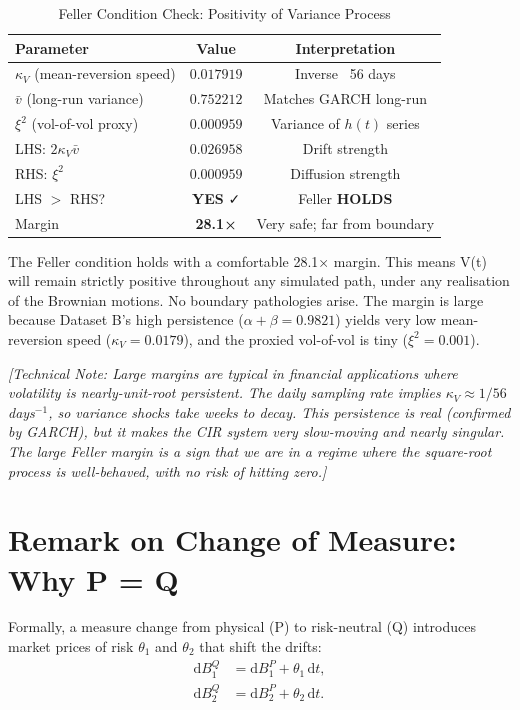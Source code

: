 \documentclass[11pt, a4paper, twoside]{article}
\begin{document}
\begin{table}[ht]
\centering
\caption{Feller Condition Check: Positivity of Variance Process}
\label{tbl:feller}
\small
\begin{tabularx}{0.75\textwidth}{l|c|c}
\toprule
\textbf{Parameter} & \textbf{Value} & \textbf{Interpretation} \\
\midrule
$\kappa_V$ (mean-reversion speed) & $0.017919$ & Inverse ~56 days \\
$\bar{v}$ (long-run variance) & $0.752212$ & Matches GARCH long-run \\
$\xi^2$ (vol-of-vol proxy) & $0.000959$ & Variance of $h(t)$ series \\
\midrule
LHS: $2 \kappa_V \bar{v}$ & $0.026958$ & Drift strength \\
RHS: $\xi^2$ & $0.000959$ & Diffusion strength \\
\midrule
LHS $>$ RHS? & \textbf{YES} ✓ & Feller \textbf{HOLDS} \\
Margin & \textbf{28.1×} & Very safe; far from boundary \\
\bottomrule
\end{tabularx}
\end{table}

The Feller condition holds with a comfortable 28.1× margin. This means V(t) will remain strictly positive throughout any simulated path, under any realisation of the Brownian motions. No boundary pathologies arise. The margin is large because Dataset B's high persistence ($\alpha + \beta = 0.9821$) yields very low mean-reversion speed ($\kappa_V = 0.0179$), and the proxied vol-of-vol is tiny ($\xi^2 = 0.001$).

\textit{[Technical Note: Large margins are typical in financial applications where volatility is nearly-unit-root persistent. The daily sampling rate implies $\kappa_V \approx 1/56$ days$^{-1}$, so variance shocks take weeks to decay. This persistence is real (confirmed by GARCH), but it makes the CIR system very slow-moving and nearly singular. The large Feller margin is a sign that we are in a regime where the square-root process is well-behaved, with no risk of hitting zero.]}

\section{Remark on Change of Measure: Why P = Q}

Formally, a measure change from physical (P) to risk-neutral (Q) introduces market prices of risk $\theta_1$ and $\theta_2$ that shift the drifts:
\begin{align}
\mathrm{d}B_1^Q &= \mathrm{d}B_1^P + \theta_1 \, \mathrm{d}t, \\
\mathrm{d}B_2^Q &= \mathrm{d}B_2^P + \theta_2 \, \mathrm{d}t.
\end{align}
\end{document}
